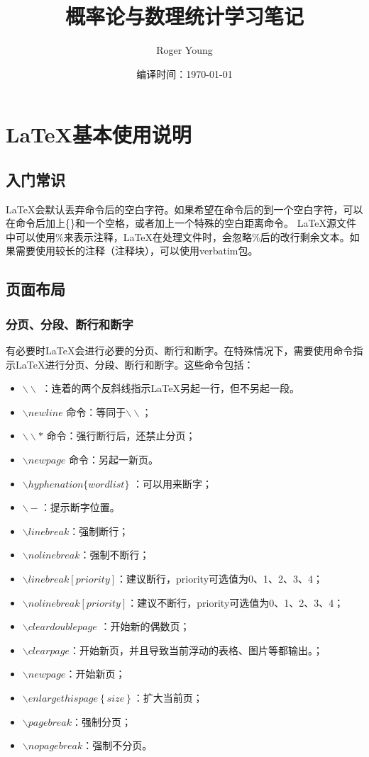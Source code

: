 \documentclass[11pt]{book}
\title{概率论与数理统计学习笔记}
\author{Roger Young}
\date{编译时间：\today}
\begin{document}
	\maketitle
	\tableofcontents
	\newpage
	
	\chapter{\LaTeX 基本使用说明}
	\section{入门常识}
	
	\LaTeX 会默认丢弃命令后的空白字符。如果希望在命令后的到一个空白字符，可以在命令后加上\{\}和一个空格，或者加上一个特殊的空白距离命令。
	\LaTeX 源文件中可以使用\%来表示注释，\LaTeX 在处理文件时，会忽略\%后的改行剩余文本。如果需要使用较长的注释（注释块），可以使用verbatim包。
		\section{页面布局}
				\subsection{分页、分段、断行和断字}
		有必要时\LaTeX 会进行必要的分页、断行和断字。在特殊情况下，需要使用命令指示\LaTeX 进行分页、分段、断行和断字。这些命令包括：
		\begin{itemize}
			\item $ \backslash \backslash $ ：连着的两个反斜线指示\LaTeX 另起一行，但不另起一段。
			\item $ \backslash newline $ 命令：等同于$ \backslash \backslash $；
			\item $ \backslash \backslash* $ 命令：强行断行后，还禁止分页；
			\item $ \backslash newpage $ 命令：另起一新页。
			\item $ \backslash hyphenation\{word list\} $ ：可以用来断字；
			\item $ \backslash- $：提示断字位置。
			\item $ \backslash linebreak $：强制断行；
			\item $ \backslash nolinebreak $：强制不断行；
			\item $ \backslash linebreak[priority] $：建议断行，priority可选值为0、1、2、3、4；
			\item $ \backslash nolinebreak[priority] $：建议不断行，priority可选值为0、1、2、3、4；
			\item $ \backslash cleardoublepage $ ：开始新的偶数页；
			\item $ \backslash clearpage $：开始新页，并且导致当前浮动的表格、图片等都输出。；
			\item $ \backslash newpage $：开始新页；
			\item $ \backslash enlargethispage\left\lbrace size\right\rbrace  $：扩大当前页；
			\item $ \backslash pagebreak $：强制分页；
			\item $ \backslash nopagebreak $：强制不分页。
			
		\end{itemize}
\end{document}
